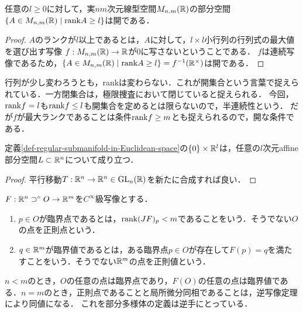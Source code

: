 \documentclass[uplatex,dvipdfmx]{jsreport}
\begin{document}
\begin{lemma}\label{lemma-semicontinuity-of-rank}
    任意の$l\ge 0$に対して，実$nm$次元線型空間$M_{n,m}(\mathbb{R})$の部分空間$\{A\in M_{n,m}(\mathbb{R})\mid \mathrm{rank} A\ge l\}$は開である．
\end{lemma}
\begin{proof}
    $A$のランクが$l$以上であるとは，$A$に対して，$l\times l$小行列の行列式の最大値を選び出す写像
    $f:M_{n,m}(\mathbb{R})\to\mathbb{R}$が$0$に写さないということである．
    $f$は連続写像であるため，$\{A\in M_{n,m}(\mathbb{R})\mid \mathrm{rank} A\ge l\}=f^{-1}(\mathbb{R}^\times)$は開である．
\end{proof}
\begin{remark}
    行列が少し変わろうとも，rankは変わらない．これが開集合という言葉で捉えられている．一方閉集合は，極限捜査において閉じていると捉えられる．
    今回，$\mathrm{rank} f=l$も$\mathrm{rank} f\le l$も開集合を定めるとは限らないので，半連続性という．
    だが$f$が最大ランクであることは条件$\mathrm{rank} f\ge m$とも捉えられるので，開な条件である．
\end{remark}

\begin{lemma}
    定義\ref{def-regular-submanifold-in-Euclidean-space}の$\{0\}\times\mathbb{R}^l$は，任意の$l$次元affine部分空間$L\subset\mathbb{R}^n$について成り立つ．
\end{lemma}
\begin{proof}
    平行移動$T:\mathbb{R}^n\to\mathbb{R}^n\in\mathrm{GL}_n(\mathbb{R})$を新たに合成すれば良い．
\end{proof}

\begin{definition}
    $F:\mathbb{R}^n\supset^\circ O\to\mathbb{R}^m$を$C^\infty$級写像とする．
    \begin{enumerate}
        \item $p\in O$が臨界点であるとは，$\mathrm{rank}(JF)_p<m$であることをいう．そうでない$O$の点を正則点という．
        \item $q\in\mathbb{R}^m$が臨界値であるとは，ある臨界点$p\in O$が存在して$F(p)=q$を満たすことをいう．そうでない$\mathbb{R}^m$の点を正則値という．
    \end{enumerate}
\end{definition}
\begin{remark}
    $n<m$のとき，$O$の任意の点は臨界点であり，$F(O)$の任意の点は臨界値である．$n=m$のとき，正則点であることと局所微分同相であることは，逆写像定理により同値になる．
    これを部分多様体の定義は逆手にとっている．
\end{remark}
\end{document}
